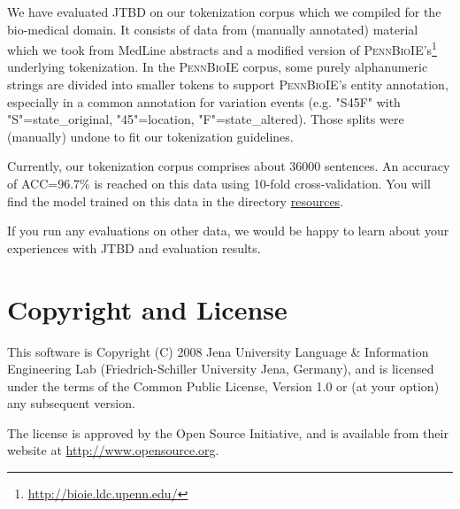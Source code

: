 \documentclass[11pt,a4paper,halfparskip]{scrartcl}
\begin{document}
We have evaluated JTBD on our tokenization corpus which we compiled
for the bio-medical domain. It consists of data from (manually
annotated) material which we took from MedLine abstracts and a
modified version of
\textsc{PennBioIE}'s\footnote{\url{http://bioie.ldc.upenn.edu/}}
underlying tokenization. In the \textsc{PennBioIE} corpus, some purely
alphanumeric strings are divided into smaller tokens to support
\textsc{PennBioIE}'s entity annotation, especially in a common
annotation for variation events (e.g.  "S45F" with "S"=state\_original,
"45"=location, "F"=state\_altered).  Those splits were (manually)
undone to fit our tokenization guidelines.

Currently, our tokenization corpus comprises about 36000 sentences.
An accuracy of ACC=96.7\% is reached on this data using 10-fold
cross-validation.  You will find the model trained on this data in the
directory \url{resources}.

If you run any evaluations on other data, we would be happy to learn about
your experiences with JTBD and evaluation results.

\section{Copyright and License}
This software is Copyright (C) 2008 Jena University Language \& Information
Engineering Lab (Friedrich-Schiller University Jena, Germany), and is
licensed under the terms of the Common Public License, Version 1.0 or (at
your option) any subsequent version.

The license is approved by the Open Source Initiative, and is
available from their website at \url{http://www.opensource.org}.



\end{document}
